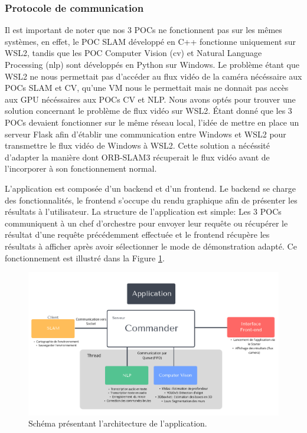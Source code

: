 \documentclass[11pt]{article}
\begin{document}
      \subsubsection{Protocole de communication}
        Il est important de noter que nos 3 POCs ne fonctionnent pas sur les mêmes systèmes, en effet, le POC SLAM développé en C++
        fonctionne uniquement sur WSL2, tandis que les POC Computer Vision (\acrshort{cv}) et Natural Language Processing (\acrshort{nlp}) sont développés en Python 
        sur Windows. Le problème étant que WSL2 ne nous permettait pas d'accéder au flux vidéo de la caméra nécéssaire aux POCs SLAM et CV, 
        qu'une VM nous le permettait mais ne donnait pas accès aux GPU nécéssaires aux POCs CV et NLP. Nous avons optés pour trouver une 
        solution
        concernant le problème de flux vidéo sur WSL2. Étant donné que les 3 POCs devaient fonctionner sur le même réseau local, l'idée de 
        mettre
        en place un serveur Flask afin d'établir une communication entre Windows et WSL2 pour transmettre le flux vidéo de Windows à WSL2. 
        Cette solution a nécéssité d'adapter la manière dont ORB-SLAM3 récuperait le flux vidéo avant de l'incorporer à son 
        fonctionnement normal.

        L'application est composée d'un backend et d'un frontend. Le backend se charge des fonctionnalités, le frontend s'occupe du rendu
        graphique afin de présenter les résultats à l'utilisateur. La structure de l'application est simple: Les 3 POCs communiquent à un 
        chef d'orchestre pour envoyer leur requête ou récupérer le résultat d'une requête précédemment effectuée et le frontend récupère
        les résultats à afficher après avoir sélectionner le mode de démonstration adapté. Ce fonctionnement est illustré dans la 
        Figure \ref{fig:Structure}.

        \begin{figure}[hbt]  
          \includegraphics[width=\textwidth]{StructureApp.png}    
          \caption{Schéma présentant l'architecture de l'application.}
          \label{fig:Structure}
        \end{figure} 
\end{document}
